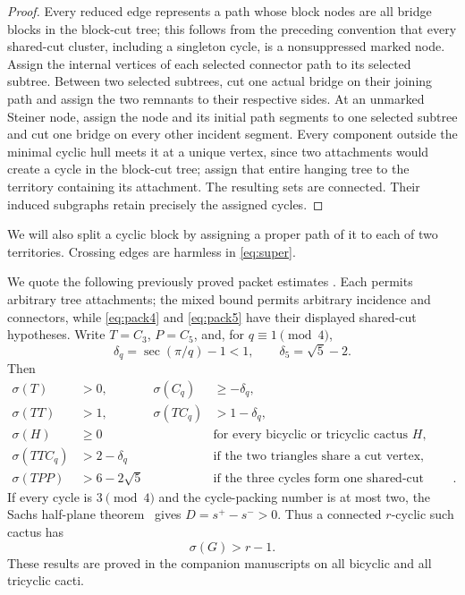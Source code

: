 \documentclass[11pt]{article}
\newcommand{\sig}{\sigma}
\begin{document}
\begin{proof}
Every reduced edge represents a path whose block nodes are all bridge blocks in
the block-cut tree; this follows from the preceding convention that every
shared-cut cluster, including a singleton cycle, is a nonsuppressed marked
node.
Assign the internal vertices of each selected connector path to its selected
subtree.  Between two selected subtrees, cut one actual bridge on their joining
path and assign the two remnants to their respective sides.  At an unmarked
Steiner node, assign the node and its initial path segments to one selected
subtree and cut one bridge on every other incident segment.  Every component
outside the minimal cyclic hull meets it at a unique vertex, since two
attachments would create a cycle in the block-cut tree; assign that entire
hanging tree to the territory containing its attachment.  The resulting sets
are connected.  Their induced subgraphs retain precisely the assigned cycles.
\end{proof}

We will also split a cyclic block by assigning a proper path of it to each of
two territories.  Crossing edges are harmless in \eqref{eq:super}.

We quote the following previously proved packet estimates
\cite{Bicyclic,Tricyclic}.  Each permits
arbitrary tree attachments; the mixed bound permits arbitrary incidence and
connectors, while \eqref{eq:pack4} and \eqref{eq:pack5} have their displayed
shared-cut hypotheses.  Write $T=C_3$,
$P=C_5$, and, for $q\equiv1\pmod4$,
\[
 \delta_q=\sec(\pi/q)-1<1,
 \qquad \delta_5=\sqrt5-2.
\]
Then
\begin{align}
 \sig(T)&>0, & \sig(C_q)&\geq-\delta_q,\label{eq:pack1}\\
 \sig(TT)&>1, & \sig(TC_q)&>1-\delta_q,\label{eq:pack2}\\
 \sig(H)&\geq0 &&\text{for every bicyclic or tricyclic cactus }H,\label{eq:pack3}\\
 \sig(TTC_q)&>2-\delta_q
 &&\text{if the two triangles share a cut vertex},\label{eq:pack4}\\
 \sig(TPP)&>6-2\sqrt5
 &&\text{if the three cycles form one shared-cut cluster}.\label{eq:pack5}
\end{align}
If every cycle is $3\pmod4$ and the cycle-packing number is at most two,
the Sachs half-plane theorem~\cite{PackingTwo} gives $D=s^+-s^->0$.  Thus a connected
$r$-cyclic such cactus has
\begin{equation}\label{eq:favorable}
 \sig(G)>r-1.
\end{equation}
These results are proved in the companion manuscripts on all bicyclic and all
tricyclic cacti.
\end{document}
